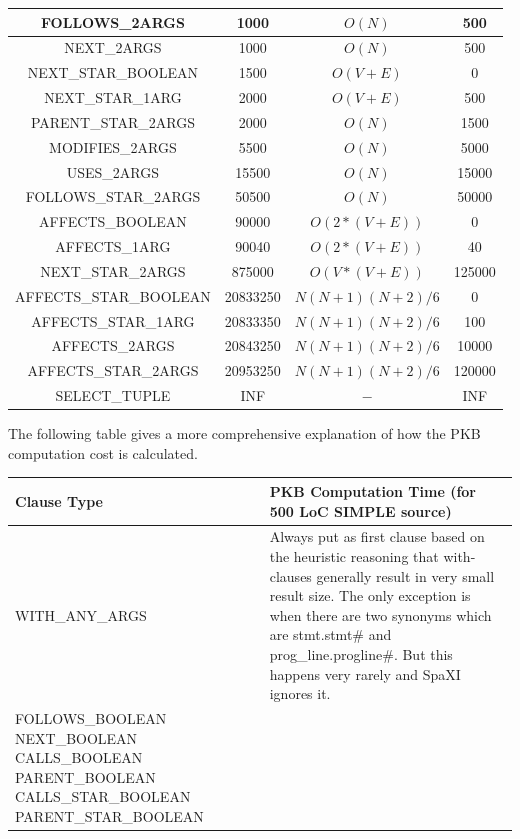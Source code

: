 \documentclass[12pt]{article}
\begin{document}
{{{{{{{{{{{{{\begin{center}
\begin{longtable}{ |c|c|c|c| }
FOLLOWS\_2ARGS&1000&$O(N)$&500\\\hline
NEXT\_2ARGS&1000&$O(N)$&500\\\hline
NEXT\_STAR\_BOOLEAN&1500&$O(V+E)$&0\\\hline
NEXT\_STAR\_1ARG&2000&$O(V+E)$&500\\\hline
PARENT\_STAR\_2ARGS&2000&$O(N)$&1500\\\hline
MODIFIES\_2ARGS&5500&$O(N)$&5000\\\hline
USES\_2ARGS&15500&$O(N)$&15000\\\hline
FOLLOWS\_STAR\_2ARGS&50500&$O(N)$&50000\\\hline
AFFECTS\_BOOLEAN&90000&$O(2*(V+E))$&0\\\hline
AFFECTS\_1ARG&90040&$O(2*(V+E))$&40\\\hline
NEXT\_STAR\_2ARGS&875000&$O(V*(V+E))$&125000\\\hline
AFFECTS\_STAR\_BOOLEAN&20833250&$N(N+1)(N+2)/6$&0\\\hline
AFFECTS\_STAR\_1ARG&20833350&$N(N+1)(N+2)/6$&100\\\hline
AFFECTS\_2ARGS&20843250&$N(N+1)(N+2)/6$&10000\\\hline
AFFECTS\_STAR\_2ARGS&20953250&$N(N+1)(N+2)/6$&120000\\\hline
SELECT\_TUPLE&INF&$-$&INF\\\hline
\end{longtable}
\end{center}
The following table gives a more comprehensive explanation of how the PKB computation cost is calculated. 
\begin{center}
\begin{longtable}{ |L{8cm} | L{9cm}| }
\hline
\textbf{ Clause Type} & \textbf{PKB Computation Time} 
(for 500 LoC SIMPLE source)  \\\hline
 WITH\_ANY\_ARGS & Always put as first clause based on the heuristic reasoning that with-clauses generally result in very small result size. The only exception is when there are two synonyms which are stmt.stmt\# and prog\_line.progline\#. But this happens very rarely and SpaXI ignores it.  \\\hline  
\newline
FOLLOWS\_BOOLEAN\newline
NEXT\_BOOLEAN\newline
CALLS\_BOOLEAN\newline
PARENT\_BOOLEAN\newline
CALLS\_STAR\_BOOLEAN\newline
PARENT\_STAR\_BOOLEAN\newline

\end{longtable}
\end{center}}}}}}}}}}}}}}
\end{document}
